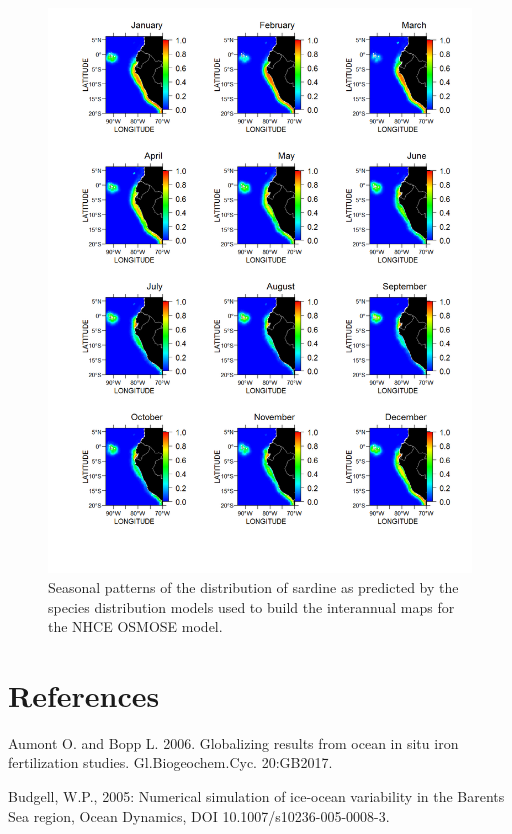 \begin{figure}
\centering
\includegraphics[height=0.8\textheight]{figures/sardine-climatology}
\caption[Seasonal patterns of the distribution of Peruvian anchovy]{Seasonal patterns of the distribution of sardine as predicted by the species distribution models used to build the interannual maps for the NHCE OSMOSE model.}
\label{fig:sardine-climatology}
\end{figure}


\section*{References}

Aumont O. and Bopp L. 2006. Globalizing results from ocean in situ iron fertilization studies. Gl.Biogeochem.Cyc. 20:GB2017.

Budgell, W.P., 2005: Numerical simulation of ice-ocean variability in the Barents Sea region, Ocean Dynamics, DOI 10.1007/s10236-005-0008-3.

